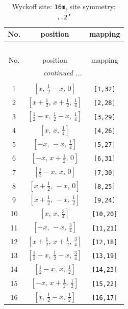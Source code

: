 \documentclass[fleqn,8pt]{jsarticle}
\begin{document}
\renewcommand{\arraystretch}{1.2}
\begin{longtable}{ccc}
\caption{Wyckoff site: {\tt 16m}, site symmetry: {\tt ..2'}}
 \\
 \hline \hline
No. & position & mapping \\ \hline \endfirsthead

\multicolumn{2}{l}{\tablename\ \thetable{}} \\
 \hline \hline
No. & position & mapping \\ \hline \endhead

 \hline \hline
\multicolumn{2}{r}{\footnotesize\it continued ...} \\ \endfoot

 \hline \hline
\multicolumn{2}{r}{} \\ \endlastfoot

1 & $\left[ x,\, \frac{1}{2} - x,\, 0 \right]$ & {\tt [1,32]} \\ \hline
2 & $\left[ x + \frac{1}{2},\, x + \frac{1}{2},\, \frac{1}{4} \right]$ & {\tt [2,28]} \\ \hline
3 & $\left[ \frac{1}{2} - x,\, \frac{1}{2} - x,\, \frac{1}{4} \right]$ & {\tt [3,29]} \\ \hline
4 & $\left[ x,\, x,\, \frac{1}{4} \right]$ & {\tt [4,26]} \\ \hline
5 & $\left[ - x,\, - x,\, \frac{1}{4} \right]$ & {\tt [5,27]} \\ \hline
6 & $\left[ - x,\, x + \frac{1}{2},\, 0 \right]$ & {\tt [6,31]} \\ \hline
7 & $\left[ \frac{1}{2} - x,\, x,\, 0 \right]$ & {\tt [7,30]} \\ \hline
8 & $\left[ x + \frac{1}{2},\, - x,\, 0 \right]$ & {\tt [8,25]} \\ \hline
9 & $\left[ x + \frac{1}{2},\, - x,\, \frac{1}{2} \right]$ & {\tt [9,24]} \\ \hline
10 & $\left[ x,\, x,\, \frac{3}{4} \right]$ & {\tt [10,20]} \\ \hline
11 & $\left[ - x,\, - x,\, \frac{3}{4} \right]$ & {\tt [11,21]} \\ \hline
12 & $\left[ x + \frac{1}{2},\, x + \frac{1}{2},\, \frac{3}{4} \right]$ & {\tt [12,18]} \\ \hline
13 & $\left[ \frac{1}{2} - x,\, \frac{1}{2} - x,\, \frac{3}{4} \right]$ & {\tt [13,19]} \\ \hline
14 & $\left[ \frac{1}{2} - x,\, x,\, \frac{1}{2} \right]$ & {\tt [14,23]} \\ \hline
15 & $\left[ - x,\, x + \frac{1}{2},\, \frac{1}{2} \right]$ & {\tt [15,22]} \\ \hline
16 & $\left[ x,\, \frac{1}{2} - x,\, \frac{1}{2} \right]$ & {\tt [16,17]} \\
\end{longtable}
\end{document}
